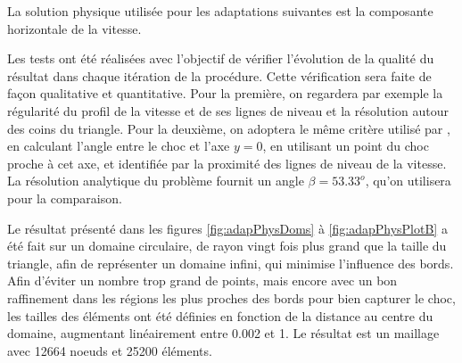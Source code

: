 \indent La solution physique utilisée pour les adaptations suivantes est la composante horizontale de la vitesse. 

\indent Les tests ont été réalisées avec l'objectif de vérifier l'évolution de la qualité du résultat dans chaque itération de la procédure. Cette vérification sera faite de façon qualitative et quantitative. Pour la première, on regardera par exemple la régularité du profil de la vitesse et de ses lignes de niveau et la résolution autour des coins du triangle. Pour la deuxième, on adoptera le même critère utilisé par \cite{leo}, en calculant l'angle entre le choc et l'axe \(y=0\), en utilisant un point du choc proche à cet axe, et identifiée par la proximité des lignes de niveau de la vitesse. La résolution analytique du problème fournit un angle \(\beta=53.33^o\), qu'on utilisera pour la comparaison.

\indent Le résultat présenté dans les figures \ref{fig:adapPhysDoms} à \ref{fig:adapPhysPlotB} a été fait sur un domaine circulaire, de rayon vingt fois plus grand que la taille du triangle, afin de représenter un domaine infini, qui minimise l'influence des bords. Afin d'éviter un nombre trop grand de points, mais encore avec un bon raffinement dans les régions les plus proches des bords pour bien capturer le choc, les tailles des éléments ont été définies en fonction de la distance au centre du domaine, augmentant linéairement entre 0.002 et 1. Le résultat est un maillage avec 12664 noeuds et 25200 éléments.

